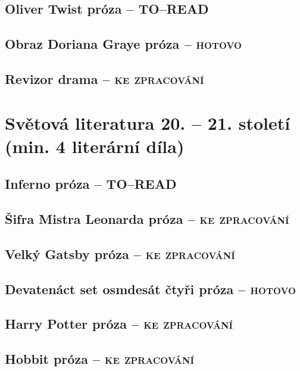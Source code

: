 \documentclass[A4paper]{extarticle} %
\begin{document}
\subsection*{Oliver Twist {\tiny{próza  -- \textsc{TO--READ}}}}

\subsection*{Obraz Doriana Graye {\tiny{próza  -- \textsc{hotovo}}}}

\subsection*{Revizor {\tiny{drama  -- \textsc{ke zpracování}}}}

\section*{Světová literatura 20. -- 21. století {\tiny{(min. 4 literární díla)}}}

\subsection*{Inferno {\tiny{próza  -- \textsc{TO--READ}}}}

\subsection*{Šifra Mistra Leonarda {\tiny{próza  -- \textsc{ke zpracování}}}}

\subsection*{Velký Gatsby {\tiny{próza  -- \textsc{ke zpracování}}}}

\subsection*{Devatenáct set osmdesát čtyři {\tiny{próza  -- \textsc{hotovo}}}}

\subsection*{Harry Potter {\tiny{próza  -- \textsc{ke zpracování}}}}

\subsection*{Hobbit {\tiny{próza  -- \textsc{ke zpracování}}}}
\end{document}
